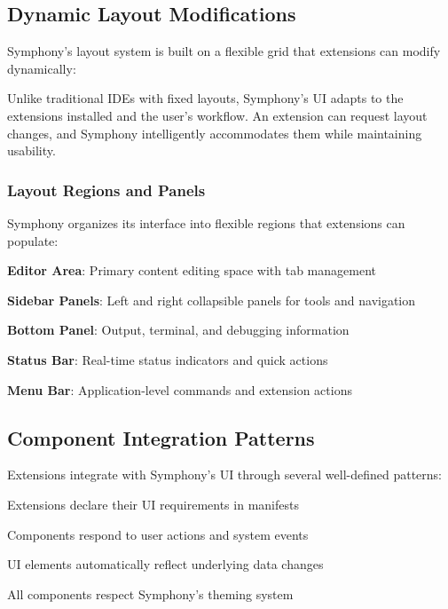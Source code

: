\subsection*{Dynamic Layout Modifications}

Symphony's layout system is built on a flexible grid that extensions can modify dynamically:

\begin{infobox}[title=Adaptive Layout Philosophy]
Unlike traditional IDEs with fixed layouts, Symphony's UI adapts to the extensions installed and the user's workflow. An extension can request layout changes, and Symphony intelligently accommodates them while maintaining usability.
\end{infobox}

\subsubsection*{Layout Regions and Panels}

Symphony organizes its interface into flexible regions that extensions can populate:

\begin{compactlist}
    \item \textbf{Editor Area}: Primary content editing space with tab management
    \item \textbf{Sidebar Panels}: Left and right collapsible panels for tools and navigation
    \item \textbf{Bottom Panel}: Output, terminal, and debugging information
    \item \textbf{Status Bar}: Real-time status indicators and quick actions
    \item \textbf{Menu Bar}: Application-level commands and extension actions
\end{compactlist}

\subsection*{Component Integration Patterns}

Extensions integrate with Symphony's UI through several well-defined patterns:

\begin{description}[leftmargin=3cm,labelwidth=2.5cm]
    \item[\textbf{Declarative}] Extensions declare their UI requirements in manifests
    \item[\textbf{Event-Driven}] Components respond to user actions and system events
    \item[\textbf{Data-Bound}] UI elements automatically reflect underlying data changes
    \item[\textbf{Themeable}] All components respect Symphony's theming system
\end{description}

